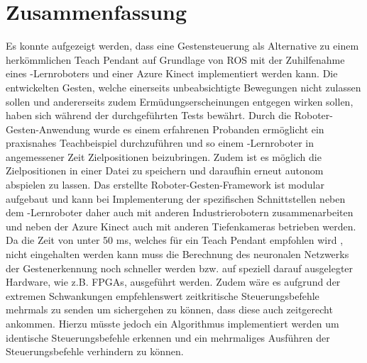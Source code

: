 \section{Zusammenfassung}
Es konnte aufgezeigt werden, dass eine Gestensteuerung als Alternative zu einem herkömmlichen Teach Pendant auf Grundlage von ROS mit der Zuhilfenahme eines -Lernroboters und einer Azure Kinect implementiert werden kann. Die entwickelten Gesten, welche einerseits unbeabsichtigte Bewegungen nicht zulassen sollen und andererseits zudem Ermüdungserscheinungen entgegen wirken sollen, haben sich während der durchgeführten Tests bewährt. Durch die Roboter-Gesten-Anwendung wurde es einem erfahrenen Probanden ermöglicht ein praxisnahes Teachbeispiel durchzuführen und so einem -Lernroboter in angemessener Zeit Zielpositionen beizubringen. Zudem ist es möglich die Zielpositionen in einer Datei zu speichern und daraufhin erneut autonom abspielen zu lassen. Das erstellte Roboter-Gesten-Framework ist modular aufgebaut und kann bei Implementerung der spezifischen Schnittstellen neben dem -Lernroboter daher auch mit anderen Industrierobotern zusammenarbeiten und neben der Azure Kinect auch mit anderen Tiefenkameras betrieben werden.\\

Da die Zeit von unter 50 ms, welches für ein Teach Pendant empfohlen wird \cite[55]{prassler_advances_2004}, nicht eingehalten werden kann  muss die Berechnung des neuronalen Netzwerks der Gestenerkennung noch schneller werden bzw. auf speziell darauf ausgelegter Hardware, wie z.B. FPGAs, ausgeführt werden. Zudem wäre es aufgrund der extremen Schwankungen empfehlenswert zeitkritische Steuerungsbefehle mehrmals zu senden um sichergehen zu können, dass diese auch zeitgerecht ankommen. Hierzu müsste jedoch ein Algorithmus implementiert werden um identische Steuerungsbefehle erkennen und ein mehrmaliges Ausführen der Steuerungsbefehle verhindern zu können.\\

